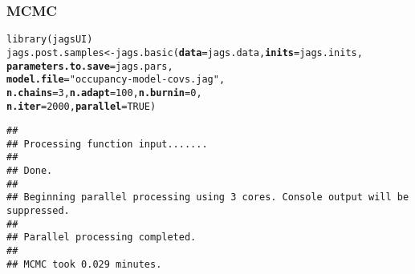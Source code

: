\documentclass[color=usenames,dvipsnames]{beamer}\usepackage[]{graphicx}\usepackage[]{xcolor}
\makeatletter
\newcommand{\hlnum}[1]{\textcolor[rgb]{0.69,0.494,0}{#1}}%
\newcommand{\hlstr}[1]{\textcolor[rgb]{0.749,0.012,0.012}{#1}}%
\newcommand{\hlstd}[1]{\textcolor[rgb]{0,0,0}{#1}}%
\newcommand{\hlkwb}[1]{\textcolor[rgb]{0,0.341,0.682}{#1}}%
\newcommand{\hlkwc}[1]{\textcolor[rgb]{0,0,0}{\textbf{#1}}}%
\newcommand{\hlkwd}[1]{\textcolor[rgb]{0.004,0.004,0.506}{#1}}%
\newenvironment{kframe}{%
 \def\at@end@of@kframe{}%
 \ifinner\ifhmode%
  \def\at@end@of@kframe{\end{minipage}}%
  \begin{minipage}{\columnwidth}%
 \fi\fi%
 \def\FrameCommand##1{\hskip\@totalleftmargin \hskip-\fboxsep
 \colorbox{shadecolor}{##1}\hskip-\fboxsep
     \hskip-\linewidth \hskip-\@totalleftmargin \hskip\columnwidth}%
 \MakeFramed {\advance\hsize-\width
   \@totalleftmargin\z@ \linewidth\hsize
   \@setminipage}}%
 {\par\unskip\endMakeFramed%
 \at@end@of@kframe}
\newenvironment{knitrout}{}{} %
\makeatother
\begin{document}
\begin{frame}[fragile]
  \frametitle{MCMC}
  \small
\begin{knitrout}\scriptsize
{}\color{fgcolor}\begin{kframe}
\begin{alltt}
\hlkwd{library}\hlstd{(jagsUI)}
\hlstd{jags.post.samples} \hlkwb{<-} \hlkwd{jags.basic}\hlstd{(}\hlkwc{data}\hlstd{=jags.data,} \hlkwc{inits}\hlstd{=jags.inits,}
                                \hlkwc{parameters.to.save}\hlstd{=jags.pars,}
                                \hlkwc{model.file}\hlstd{=}\hlstr{"occupancy-model-covs.jag"}\hlstd{,}
                                \hlkwc{n.chains}\hlstd{=}\hlnum{3}\hlstd{,} \hlkwc{n.adapt}\hlstd{=}\hlnum{100}\hlstd{,} \hlkwc{n.burnin}\hlstd{=}\hlnum{0}\hlstd{,}
                                \hlkwc{n.iter}\hlstd{=}\hlnum{2000}\hlstd{,} \hlkwc{parallel}\hlstd{=}\hlnum{TRUE}\hlstd{)}
\end{alltt}
\begin{verbatim}
## 
## Processing function input....... 
## 
## Done. 
##  
## Beginning parallel processing using 3 cores. Console output will be suppressed.
## 
## Parallel processing completed.
## 
## MCMC took 0.029 minutes.
\end{verbatim}
\end{kframe}
\end{knitrout}
\end{frame}
\end{document}
